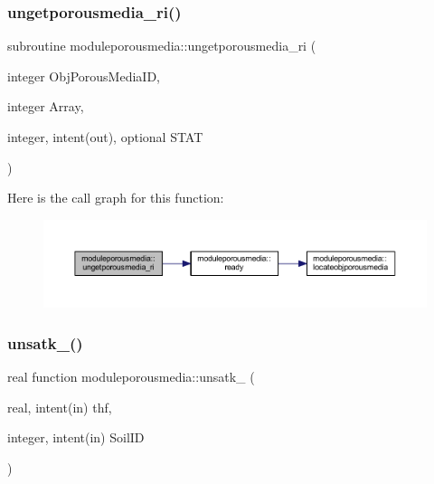 \subsubsection{\texorpdfstring{ungetporousmedia\+\_\+ri()}{ungetporousmedia\_ri()}}
{\footnotesize\ttfamily subroutine moduleporousmedia\+::ungetporousmedia\+\_\+ri (\begin{DoxyParamCaption}\item[{integer}]{Obj\+Porous\+Media\+ID,  }\item[{integer}]{Array,  }\item[{integer, intent(out), optional}]{S\+T\+AT }\end{DoxyParamCaption})\hspace{0.3cm}{\ttfamily [private]}}

Here is the call graph for this function\+:\nopagebreak
\begin{figure}[H]
\begin{center}
\leavevmode
\includegraphics[width=350pt]{namespacemoduleporousmedia_a1ceb6ca7f8349192893a0bd63cf7403d_cgraph}
\end{center}
\end{figure}
\mbox{\label{namespacemoduleporousmedia_a27a116705cfa7c67ac33a00726529cfa}} 
\subsubsection{\texorpdfstring{unsatk\+\_\+()}{unsatk\_()}}
{\footnotesize\ttfamily real function moduleporousmedia\+::unsatk\+\_\+ (\begin{DoxyParamCaption}\item[{real, intent(in)}]{thf,  }\item[{integer, intent(in)}]{Soil\+ID }\end{DoxyParamCaption})\hspace{0.3cm}{\ttfamily [private]}}

